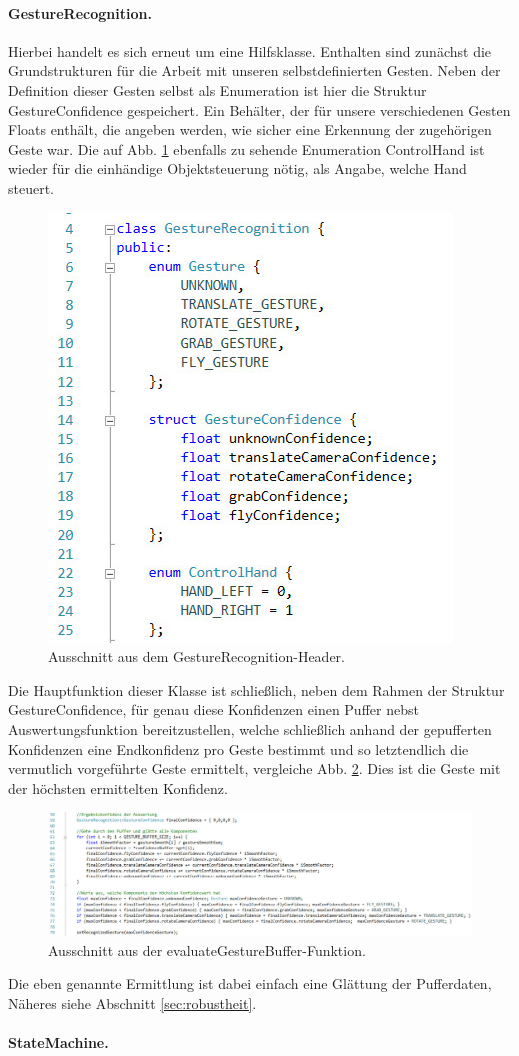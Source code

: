 	\paragraph{GestureRecognition.} Hierbei handelt es sich erneut um eine Hilfsklasse. Enthalten sind zunächst die Grundstrukturen für die Arbeit mit unseren selbstdefinierten Gesten. Neben der Definition dieser Gesten selbst als Enumeration ist hier die Struktur \glqq GestureConfidence\grqq{} gespeichert. Ein Behälter, der für unsere verschiedenen Gesten Floats enthält, die angeben werden, wie sicher eine Erkennung der zugehörigen Geste war. Die auf Abb. \ref{fig:gestrechead} ebenfalls zu sehende Enumeration ControlHand ist wieder für die einhändige Objektsteuerung nötig, als Angabe, welche Hand steuert.\par
	\begin{figure}[h]
	\centering
	\includegraphics[scale=.4]{pictures/gesturerec.jpg}
	\caption{Ausschnitt aus dem GestureRecognition-Header.}\label{fig:gestrechead}
	\end{figure}	
	Die Hauptfunktion dieser Klasse ist schließlich, neben dem Rahmen der Struktur GestureConfidence, für genau diese Konfidenzen einen Puffer nebst Auswertungsfunktion bereitzustellen, welche schließlich anhand der gepufferten Konfidenzen eine Endkonfidenz pro Geste bestimmt und so letztendlich die vermutlich vorgeführte Geste ermittelt, vergleiche Abb. \ref{fig:evalgestbuf}. Dies ist die Geste mit der höchsten ermittelten Konfidenz.
	\begin{figure}
	\centering
	\includegraphics[width=\textwidth]{pictures/gestureeval.jpg}
	\caption{Ausschnitt aus der evaluateGestureBuffer-Funktion.}\label{fig:evalgestbuf}
	\end{figure}
	Die eben genannte \glqq Ermittlung\grqq{} ist dabei einfach eine Glättung der Pufferdaten, Näheres siehe Abschnitt \ref{sec:robustheit}.\par\medskip
	\paragraph{StateMachine.}
